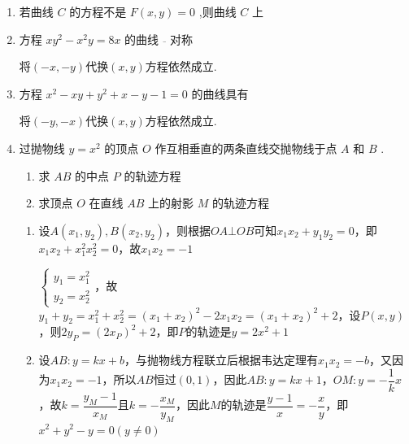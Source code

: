 \begin{enumerate}
    \item 若曲线 $C$ 的方程不是 $F\left( {x,y}\right)  = 0$ ,则曲线 $C$ 上

    \item 方程 $x{y}^{2} - {x}^{2}y = {8x}$ 的曲线$\overline{\quad}$对称
    \begin{jieda}
        将$(-x, -y)$代换$(x, y)$方程依然成立.
    \end{jieda}
    
    \item 方程 ${x}^{2} - {xy} + {y}^{2} + x - y - 1 = 0$ 的曲线具有
    \begin{jieda}
        将$(-y, -x)$代换$(x, y)$方程依然成立.
    \end{jieda}
    
    \item 过抛物线 $y = {x}^{2}$ 的顶点 $O$ 作互相垂直的两条直线交抛物线于点 $A$ 和 $B$ .
    \begin{enumerate}
        \item 求 ${AB}$ 的中点 $P$ 的轨迹方程
        \item 求顶点 $O$ 在直线 ${AB}$ 上的射影 $M$ 的轨迹方程
    \end{enumerate}
    \begin{jieda}
        \begin{enumerate}
            \item 设$A(x_1, y_2), B(x_2, y_2)$，则根据$OA \bot OB$可知$x_1x_2+y_1y_2 = 0$，即$x_1x_2+x_1^2x_2^2 = 0$，故$x_1x_2 = -1$

            $\left\{\begin{array}{l}
                 y_1 = x_1^2 \\
                 y_2 = x_2^2
            \end{array}\right.$，故$y_1+y_2 = x_1^2+x_2^2 = (x_1+x_2)^2-2x_1x_2 = (x_1+x_2)^2+2$，设$P(x, y)$，则$2y_P = (2x_P)^2+2$，即$P$的轨迹是$y = 2x^2+1$
            \item 设$AB: y = kx+b$，与抛物线方程联立后根据韦达定理有$x_1x_2 = -b$，又因为$x_1x_2 = -1$，所以$AB$恒过$(0, 1)$，因此$AB: y = kx+1$，$OM: y = -\dfrac{1}{k}x$，故$k = \dfrac{y_M - 1}{x_M}$且$k = -\dfrac{x_M}{y_M}$，因此$M$的轨迹是$\dfrac{y - 1}{x} = -\dfrac{x}{y}$，即$x^2+y^2-y = 0(y \neq 0)$
        \end{enumerate}
    \end{jieda}
    

\end{enumerate}
